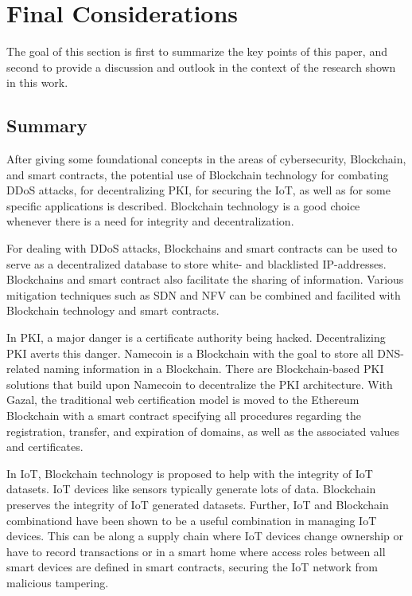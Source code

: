 \section{Final Considerations}

The goal of this section is first to summarize the key points of this paper, and second to provide a discussion and outlook in the context of the research shown in this work.

\subsection{Summary}

After giving some foundational concepts in the areas of cybersecurity, Blockchain, and smart contracts, the potential use of Blockchain technology for combating DDoS attacks, for decentralizing PKI, for securing the IoT, as well as for some specific applications is described. Blockchain technology is a good choice whenever there is a need for integrity and decentralization.

For dealing with DDoS attacks, Blockchains and smart contracts can be used to serve as a decentralized database to store white- and blacklisted IP-addresses. Blockchains and smart contract also facilitate the sharing of information.
Various mitigation techniques such as SDN and NFV can be combined and facilited with Blockchain technology and smart contracts.

In PKI, a major danger is a certificate authority being hacked. Decentralizing PKI averts this danger. Namecoin is a Blockchain with the goal to store all DNS-related naming information in a Blockchain. There are Blockchain-based PKI solutions that build upon Namecoin to decentralize the PKI architecture.
With Gazal, the traditional web certification model is moved to the Ethereum Blockchain with a smart contract specifying all procedures regarding the registration, transfer, and expiration of domains, as well as the associated values and certificates.

In IoT, Blockchain technology is proposed to help with the integrity of IoT datasets. IoT devices like sensors typically generate lots of data. Blockchain preserves the integrity of IoT generated datasets. Further, IoT and Blockchain combinationd have been shown to be a useful
combination in managing IoT devices. This can be along a supply chain where IoT devices change ownership or have to record transactions or in a smart home
where access roles between all smart devices are defined in smart contracts, securing the IoT network from malicious tampering.

